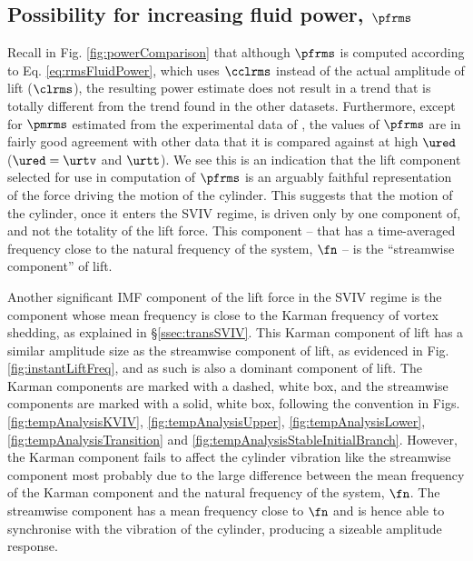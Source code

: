 \documentclass[a4paper,fleqn]{cas-sc}
\begin{document}
\subsection{Possibility for increasing fluid power, $\pfrms$} \label{ssec:possIncrease}
Recall in Fig. \ref{fig:powerComparison} that although $\pfrms$ is computed according to Eq. \ref{eq:rmsFluidPower}, which uses $\cclrms$ instead of the actual \rms{} amplitude of lift ($\clrms$), the resulting power estimate does not result in a trend that is totally different from the trend found in the other datasets. Furthermore, except for $\pmrms$ estimated from the experimental data of \citet{Nguyen2012}, the values of $\pfrms$ are in fairly good agreement with other data that it is compared against at high $\ured$ ($\ured = \urtv$ and $\urtt$). We see this is an indication that the lift component selected for use in computation of $\pfrms$ is an arguably faithful representation of the force driving the motion of the cylinder. This suggests that the motion of the cylinder, once it enters the SVIV regime, is driven only by one component of, and not the totality of the lift force. This component -- that has a time-averaged frequency close to the natural frequency of the system, $\fn$ -- is the ``streamwise component'' of lift.

Another significant IMF component of the lift force in the SVIV regime is the component whose mean frequency is close to the Karman frequency of vortex shedding, as explained in \S\ref{ssec:transSVIV}. This Karman component of lift has a similar amplitude size as the streamwise component of lift, as evidenced in Fig. \ref{fig:instantLiftFreq}, and as such is also a dominant component of lift. The Karman components are marked with a dashed, white box, and the streamwise components are marked with a solid, white box, following the convention in Figs. \ref{fig:tempAnalysisKVIV}, \ref{fig:tempAnalysisUpper}, \ref{fig:tempAnalysisLower}, \ref{fig:tempAnalysisTransition} and \ref{fig:tempAnalysisStableInitialBranch}. However, the Karman component fails to affect the cylinder vibration like the streamwise component most probably due to the large difference between the mean frequency of the Karman component and the natural frequency of the system, $\fn$.  The streamwise component has a mean frequency close to $\fn$ and is hence able to synchronise with the vibration of the cylinder, producing a sizeable amplitude response.
\end{document}
